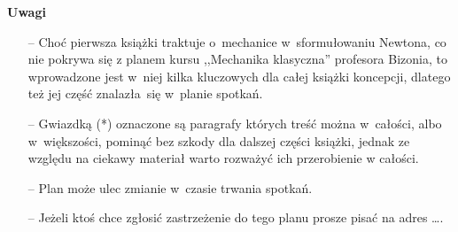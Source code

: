 \documentclass[a4paper,11pt]{article}
\begin{document}
\noindent
\textbf{Uwagi}
\begin{itemize}
\item[--] Choć pierwsza książki traktuje o~mechanice w~sformułowaniu
  Newtona, co nie pokrywa się z planem kursu ,,Mechanika klasyczna''
  profesora Bizonia, to wprowadzone jest w~niej kilka kluczowych dla
  całej książki koncepcji, dlatego też jej część znalazła~się w~planie
  spotkań.

\item[--] Gwiazdką (*) oznaczone są paragrafy których treść można
  w~całości, albo w~większości, pominąć bez szkody dla dalszej części
  książki, jednak ze względu na ciekawy materiał warto rozważyć ich
  przerobienie w całości.

\item[--] Plan może ulec zmianie w~czasie trwania spotkań.

\item[--] Jeżeli ktoś chce zgłosić zastrzeżenie do tego planu prosze
  pisać na adres \ldots .

\end{itemize}
\end{document}
